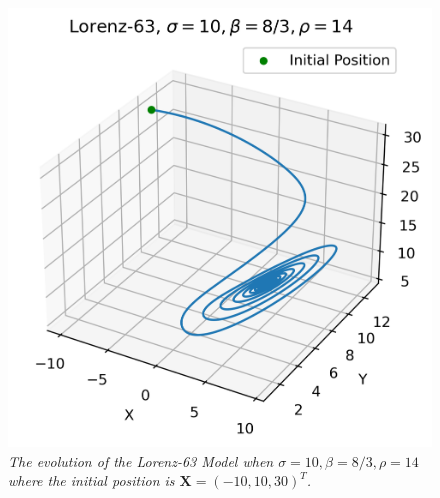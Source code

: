 \begin{figure}[p]
    \centering
    \includegraphics[scale=0.8]{graphics/Lorenz63_14.png}
    \caption{\textit{The evolution of the Lorenz-63 Model when $\sigma=10, \beta=8/3, \rho=14$ where the initial position is $\textbf{X} = (-10,10,30)^T$.}}
    \label{fig:lor63r14}
\end{figure}
